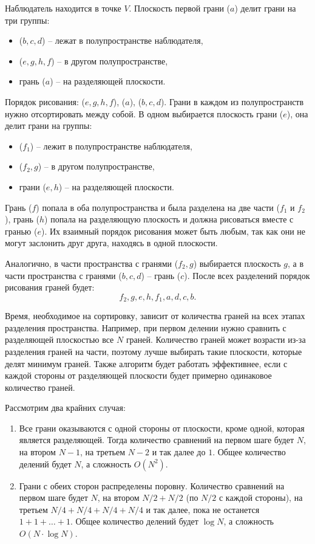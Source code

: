 Наблюдатель находится в точке $V$. Плоскость первой грани ($a$) делит грани на три группы: 
\begin{itemize}
    \item ($b, c, d$) – лежат в полупространстве наблюдателя,
    \item ($e, g, h, f$) – в другом полупространстве,
    \item грань ($a$) – на разделяющей плоскости.
\end{itemize}
Порядок рисования: ($e, g, h, f$), ($a$), ($b, c, d$). Грани в каждом из полупространств нужно отсортировать между собой. 
В одном выбирается плоскость грани ($e$), она делит грани на группы:
\begin{itemize}
    \item ($f_1$) – лежит в полупространстве наблюдателя,
    \item ($f_2, g$) – в другом полупространстве,
    \item грани ($e, h$) – на разделяющей плоскости.
\end{itemize}
Грань ($f$) попала в оба полупространства и была разделена на две части ($f_1$ и $f_2$), грань ($h$) попала на разделяющую плоскость и должна рисоваться вместе с гранью ($e$). Их взаимный порядок рисования может быть любым, так как они не могут заслонить друг друга, находясь в одной плоскости. 

Аналогично, в части пространства с гранями ($f_2, g$) выбирается плоскость $g$, а в части пространства с гранями ($b, c, d$) – грань ($c$). После всех разделений порядок рисования граней будет: 
\[
f_2, g, e, h, f_1, a, d, c, b.
\]

Время, необходимое на сортировку, зависит от количества граней на всех этапах разделения пространства. Например, при первом делении нужно сравнить с разделяющей плоскостью все $N$ граней. Количество граней может возрасти из-за разделения граней на части, поэтому лучше выбирать такие плоскости, которые делят минимум граней. Также алгоритм будет работать эффективнее, если с каждой стороны от разделяющей плоскости будет примерно одинаковое количество граней.

Рассмотрим два крайних случая:
\begin{enumerate}
    \item Все грани оказываются с одной стороны от плоскости, кроме одной, которая является разделяющей. Тогда количество сравнений на первом шаге будет $N$, на втором $N-1$, на третьем $N-2$ и так далее до $1$. Общее количество делений будет $N$, а сложность $O(N^2)$.
    \item Грани с обеих сторон распределены поровну. Количество сравнений на первом шаге будет $N$, на втором $N/2 + N/2$ (по $N/2$ с каждой стороны), на третьем $N/4 + N/4 + N/4 + N/4$ и так далее, пока не останется $1 + 1 + \ldots + 1$. Общее количество делений будет $\log N$, а сложность $O(N \cdot \log N)$.~\cite{polski}
\end{enumerate} 


